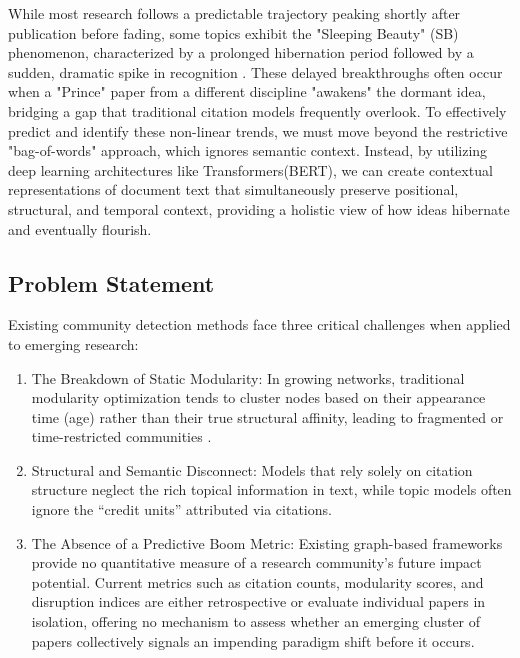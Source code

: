 \documentclass[a4paper,12pt]{article}
\begin{document}
While most research follows a predictable trajectory peaking shortly after publication 
before fading, some topics exhibit the "Sleeping Beauty" (SB) phenomenon, characterized by 
a prolonged hibernation period followed by a sudden, dramatic spike in recognition
\parencites{van_raan_sleeping_2004}{ke_defining_2015}. These delayed breakthroughs 
often occur when a "Prince" paper from a different discipline "awakens" the dormant idea, 
bridging a gap that traditional citation models frequently overlook. To effectively predict 
and identify these non-linear trends, we must move beyond the restrictive "bag-of-words" 
approach, which ignores semantic context. Instead, by utilizing deep learning architectures 
like Transformers(BERT), we can create contextual representations of document text that 
simultaneously preserve positional, structural, and temporal context\parencite{devlin_bert_2019}, 
providing a holistic view of how ideas hibernate and eventually flourish.

\subsection{Problem Statement}
Existing community detection methods face three critical challenges when applied to emerging 
research:
\vspace{-25pt}
\begin{enumerate}
    \item The Breakdown of Static Modularity: In growing networks, traditional modularity 
    optimization tends to cluster nodes based on their appearance time (age) rather than their 
    true structural affinity, leading to fragmented or time-restricted communities
    \parencite{medo_optimal_2019}.
    \vspace{-10pt}
    \item Structural and Semantic Disconnect: Models that rely solely on citation structure 
    neglect the rich topical information in text, while topic models often ignore the 
    “credit units” attributed via citations\parencite{huang_topic-sensitive_2018}.
    \vspace{-10pt}
    \item The Absence of a Predictive Boom Metric: Existing graph-based frameworks provide no 
    quantitative measure of a research community's future impact potential. Current metrics 
    such as citation counts, modularity scores, and disruption indices are either 
    retrospective or evaluate individual papers in isolation\parencites{ke_defining_2015}{patel_characterizing_2022}, offering no mechanism to assess whether an emerging 
    cluster of papers collectively signals an impending paradigm shift before it occurs.
\end{enumerate}
\end{document}
